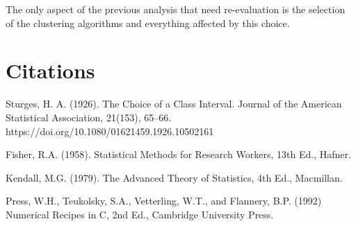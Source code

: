 \documentclass[12pt, a4paper]{article}
\begin{document}
The only aspect of the previous analysis that need re-evaluation is the selection of the clustering algorithms and everything affected by this choice.

\section{Citations}

Sturges, H. A. (1926). The Choice of a Class Interval. Journal of the American Statistical Association, 21(153), 65–66. https://doi.org/10.1080/01621459.1926.10502161
\newline

Fisher, R.A. (1958). Statistical Methods for Research Workers, 13th Ed., Hafner. 
\newline

Kendall, M.G. (1979). The Advanced Theory of Statistics, 4th Ed., Macmillan.
\newline

Press, W.H., Teukolsky, S.A., Vetterling, W.T., and Flannery, B.P. (1992) Numerical Recipes in C, 2nd Ed., Cambridge University Press.
\end{document}
